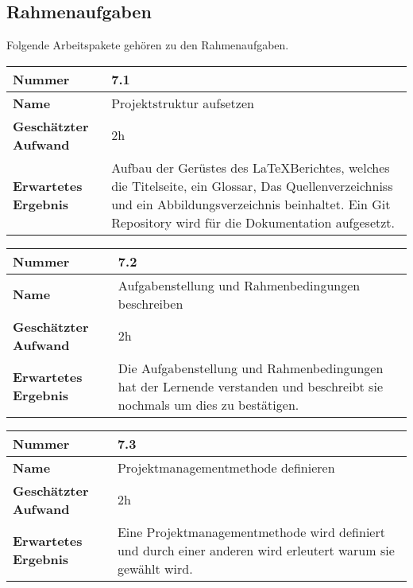 \subsection{Rahmenaufgaben}
Folgende Arbeitspakete gehören zu den Rahmenaufgaben.

\begin{longtable}{p{}|p{}}
	\hline
	\textbf{Nummer}                 & \textbf{7.1}            \\
	\hline
	\textbf{Name}   				& Projektstruktur aufsetzen                  \\
	\hline
	\textbf{Geschätzter Aufwand}    & 2h                                    \\
	\hline
	\textbf{Erwartetes Ergebnis}    & Aufbau der Gerüstes des \LaTeX Berichtes, welches die Titelseite, ein Glossar, Das Quellenverzeichniss und ein Abbildungsverzeichnis beinhaltet. Ein Git Repository wird für die Dokumentation aufgesetzt.                                    \\
	\hline
\end{longtable}\label{tab:auswerten-7.1}

\begin{longtable}{p{}|p{}}
	\hline
	\textbf{Nummer}                 & \textbf{7.2}            \\
	\hline
	\textbf{Name}   				& Aufgabenstellung und Rahmenbedingungen beschreiben                  \\
	\hline
	\textbf{Geschätzter Aufwand}    & 2h                                    \\
	\hline
	\textbf{Erwartetes Ergebnis}    & Die Aufgabenstellung und Rahmenbedingungen hat der Lernende verstanden und beschreibt sie nochmals um dies zu bestätigen.                                    \\
	\hline
\end{longtable}\label{tab:rahmenaufgaben-7.2}

\begin{longtable}{p{}|p{}}
	\hline
	\textbf{Nummer}                 & \textbf{7.3}            \\
	\hline
	\textbf{Name}   				& Projektmanagementmethode definieren                  \\
	\hline
	\textbf{Geschätzter Aufwand}    & 2h                                    \\
	\hline
	\textbf{Erwartetes Ergebnis}    & Eine Projektmanagementmethode wird definiert und durch einer anderen wird erleutert warum sie gewählt wird.                                    \\
	\hline
\end{longtable}\label{tab:rahmenaufgaben-7.3}

